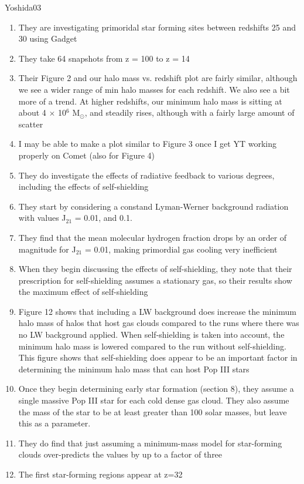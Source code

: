 \documentclass[a4paper,fleqn,usenatbib]{mnras}
\begin{document}
\li Yoshida03
\begin{enumerate}
	\item They are investigating primoridal star forming sites between redshifts 25 and 30 using Gadget
	\item They take 64 snapshots from z = 100 to z = 14
	\item Their Figure 2 and our halo mass vs. redshift plot are fairly similar, although we see a wider range of min halo masses for each redshift. We also see a bit more of a trend. At higher redshifts, our minimum halo mass is sitting at about 4 $\times$ 10$^{6}$ M$_{\odot}$, and steadily rises, although with a fairly large amount of scatter
	\item I may be able to make a plot similar to Figure 3 once I get YT working properly on Comet (also for Figure 4)
	\item They do investigate the effects of radiative feedback to various degrees, including the effects of self-shielding
	\item They start by considering a constand Lyman-Werner background radiation with values J$_{21}$ = 0.01, and 0.1. 
	\item They find that the mean molecular hydrogen fraction drops by an order of magnitude for J$_{21}$ = 0.01, making primordial gas cooling very inefficient
	\item When they begin discussing the effects of self-shielding, they note that their prescription for self-shielding assumes a stationary gas, so their results show the maximum effect of self-shielding
	\item Figure 12 shows that including a LW background does increase the minimum halo mass of halos that host gas clouds compared to the runs where there was no LW background applied. When self-shielding is taken into account, the minimum halo mass is lowered compared to the run without self-shielding. This figure shows that self-shielding does appear to be an important factor in determining the minimum halo mass that can host Pop III stars
	\item Once they begin determining early star formation (section 8), they assume a single massive Pop III star for each cold dense gas cloud. They also assume the mass of the star to be at least greater than 100 solar masses, but leave this as a parameter.
	\item They do find that just assuming a minimum-mass model for star-forming clouds over-predicts the values by up to a factor of three
	\item The first star-forming regions appear at z=32

\end{enumerate}
\end{document}
